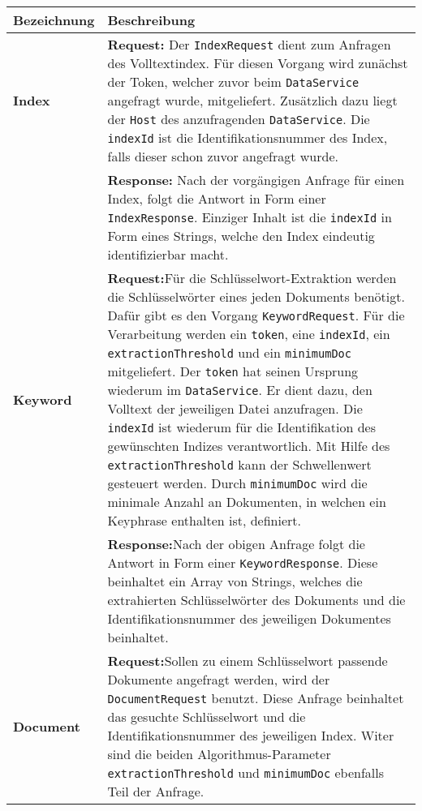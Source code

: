 \begin{longtable}{|p{4cm}| p{8cm}|}
  \hline
    \textbf{Bezeichnung} & \textbf{Beschreibung}\\\hline
    \textbf{Index} & \textbf{Request:} \newline Der \texttt{IndexRequest} dient zum Anfragen des Volltextindex. Für diesen Vorgang wird zunächst der \gls{Token}, welcher zuvor beim \texttt{DataService} angefragt wurde, mitgeliefert. Zusätzlich dazu liegt der \texttt{Host} des anzufragenden \texttt{DataService}. Die \texttt{indexId} ist die Identifikationsnummer des Index, falls dieser schon zuvor angefragt wurde.\newline\\
     &\textbf{Response:} \newline Nach der vorgängigen Anfrage für einen Index, folgt die Antwort in Form einer \texttt{IndexResponse}. Einziger Inhalt ist die \texttt{indexId} in Form eines Strings, welche den Index eindeutig identifizierbar macht.\\\hline
    \textbf{Keyword} &\textbf{Request:}\newline Für die Schlüsselwort-Extraktion werden die Schlüsselwörter eines jeden Dokuments benötigt. Dafür gibt es den Vorgang \texttt{KeywordRequest}. Für die Verarbeitung werden ein \texttt{token}, eine \texttt{indexId}, ein \texttt{extractionThreshold} und ein \texttt{minimumDoc} mitgeliefert. Der \texttt{token} hat seinen Ursprung wiederum im \texttt{DataService}. Er dient dazu, den Volltext der jeweiligen Datei anzufragen. Die \texttt{indexId} ist wiederum für die Identifikation des gewünschten Indizes verantwortlich. Mit Hilfe des \texttt{extractionThreshold} kann der Schwellenwert gesteuert werden. Durch \texttt{minimumDoc} wird die minimale Anzahl an Dokumenten, in welchen ein \gls{Keyphrase} enthalten ist, definiert. \newline\\
     & \textbf{Response:}\newline Nach der obigen Anfrage folgt die Antwort in Form einer \texttt{KeywordResponse}. Diese beinhaltet ein Array von Strings, welches die extrahierten Schlüsselwörter des Dokuments und die Identifikationsnummer des jeweiligen Dokumentes beinhaltet.\\\hline
    \textbf{Document} & \textbf{Request:}\newline Sollen zu einem Schlüsselwort passende Dokumente angefragt werden, wird der \texttt{DocumentRequest} benutzt. Diese Anfrage beinhaltet das gesuchte Schlüsselwort und die Identifikationsnummer des jeweiligen Index. Witer sind die beiden Algorithmus-Parameter  \texttt{extractionThreshold} und \texttt{minimumDoc} ebenfalls Teil der Anfrage.\newline\\

\end{longtable}
